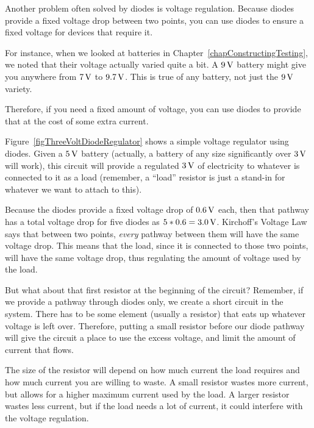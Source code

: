 Another problem often solved by diodes is voltage regulation.
Because diodes provide a fixed voltage drop between two points, you can use diodes to ensure a fixed voltage for devices that require it.

For instance, when we looked at batteries in Chapter~\ref{chapConstructingTesting}, we noted that their voltage actually varied quite a bit.
A $9\,\si{\volt}$ battery might give you anywhere from $7\,\si{\volt}$ to $9.7\,\si{\volt}$.
This is true of any battery, not just the $9\,\si{\volt}$ variety.

Therefore, if you need a fixed amount of voltage, you can use diodes to provide that at the cost of some extra current.

Figure~\ref{figThreeVoltDiodeRegulator} shows a simple voltage regulator using diodes.
Given a $5\,\si{\volt}$ battery (actually, a battery of any size significantly over $3\,\si{\volt}$ will work), this circuit will provide a regulated $3\,\si{\volt}$ of electricity to whatever is connected to it as a load (remember, a ``load'' resistor is just a stand-in for whatever we want to attach to this).


Because the diodes provide a fixed voltage drop of $0.6\,\si{\volt}$ each, then that pathway has a total voltage drop for five diodes as $5 * 0.6 = 3.0\,\si{\volt}$.
Kirchoff's Voltage Law says that between two points, \emph{every} pathway between them will have the same voltage drop.
This means that the load, since it is connected to those two points, will have the same voltage drop, thus regulating the amount of voltage used by the load.

But what about that first resistor at the beginning of the circuit?
Remember, if we provide a pathway through diodes only, we create a short circuit in the system.
There has to be some element (usually a resistor) that eats up whatever voltage is left over.
Therefore, putting a small resistor before our diode pathway will give the circuit a place to use the excess voltage, and limit the amount of current that flows.

The size of the resistor will depend on how much current the load requires and how much current you are willing to waste.
A small resistor wastes more current, but allows for a higher maximum current used by the load.
A larger resistor wastes less current, but if the load needs a lot of current, it could interfere with the voltage regulation.

